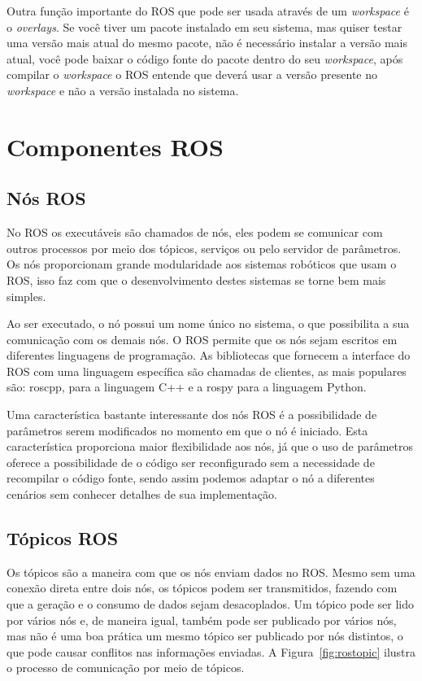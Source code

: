 Outra função importante do ROS que pode ser usada através de um \textit{workspace} é o \textit{overlays}. Se você tiver um pacote instalado em seu sistema, mas quiser testar uma versão mais atual do mesmo pacote, não é necessário instalar a versão mais atual, você pode baixar o código fonte do pacote dentro do seu \textit{workspace}, após compilar o \textit{workspace} o ROS entende que deverá usar a versão presente no \textit{workspace} e não a versão instalada no sistema.


\section{Componentes ROS}

\subsection{Nós ROS}
No ROS os executáveis são chamados de nós, eles podem se comunicar com outros processos por meio dos tópicos, serviços ou pelo servidor de parâmetros. Os nós proporcionam grande modularidade aos sistemas robóticos que usam o ROS, isso faz com que o desenvolvimento destes sistemas se torne bem mais simples.

Ao ser executado, o nó possui um nome único no sistema, o que possibilita a sua comunicação com os demais nós. O ROS permite que os nós sejam escritos em diferentes linguagens de programação. As bibliotecas que fornecem a interface do ROS com uma linguagem específica são chamadas de clientes, as mais populares são: roscpp, para a linguagem C++ e a rospy para a linguagem Python.

Uma característica bastante interessante dos nós ROS é a possibilidade de parâmetros serem modificados no momento em que o nó é iniciado. Esta característica proporciona maior flexibilidade aos nós, já que o uso de parâmetros oferece a possibilidade de o código ser reconfigurado sem a necessidade de recompilar o código fonte, sendo assim podemos adaptar o nó a diferentes cenários sem conhecer detalhes de sua implementação. 


\subsection{Tópicos ROS}

Os tópicos são a maneira com que os nós enviam dados no ROS\@. Mesmo sem uma conexão direta entre dois nós, os tópicos podem ser transmitidos, fazendo com que a geração e o consumo de dados sejam desacoplados. Um tópico pode ser lido por vários nós e, de maneira igual, também pode ser publicado por vários nós, mas não é uma boa prática um mesmo tópico ser publicado por nós distintos, o que pode causar conflitos nas informações enviadas. A Figura~\ref{fig:rostopic} ilustra o processo de comunicação por meio de tópicos.

